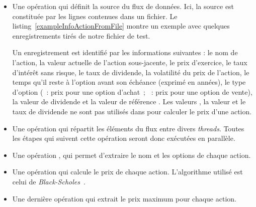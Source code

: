 \begin{itemize}

\item Une op\'eration qui d\'efinit la source du flux de donn\'ees. Ici, la source est constitu\'ee par les lignes contenues dans un fichier. Le listing~\ref{exampleInfoActionFromFile} montre un exemple avec quelques enregistrements tir\'es de notre fichier de test. 

Un enregistrement est identifi\'e par les informations suivantes : le nom de l'action, la valeur actuelle de l'action sous-jacente, le prix d'exercice, le taux d'int\'er\^et sans risque, le taux de dividende, la volatilit\'e du prix de l'action, le temps qu'il reste \`a l'option avant son \'ech\'eance (exprim\'e en ann\'ees), le type d'option (~: prix pour une option d'achat~; ~: prix pour une option de vente), la valeur de dividende et la valeur de r\'ef\'erence . 
Les valeurs , la valeur et le taux de dividende ne sont pas utilis\'es dans  pour calculer le prix d'une action.

\item Une op\'eration qui r\'epartit les \'el\'ements du flux entre divers \emph{threads}.
Toutes les \'etapes qui suivent cette op\'eration seront donc ex\'ecut\'ees en parall\`ele.

\item Une op\'eration  , qui permet d'extraire le nom et les options de chaque action.



\item  Une op\'eration qui calcule le prix de chaque action. L'algorithme utilis\'e est celui de \emph{Black-Scholes}~\citep{macbeth1979empirical}. 

\item Une derni\`ere op\'eration qui extrait le prix maximum pour chaque action.


\end{itemize}

